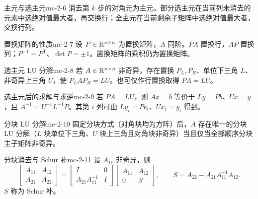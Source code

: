 \begin{definition}{主元与选主元}{mc-2-6}
消去第 $k$ 步的对角元为主元。部分选主元在当前列未消去的元素中选绝对值最大者，再交换行；全主元在当前剩余子矩阵中选绝对值最大者，交换行列。
\end{definition}

\begin{lemma}{置换矩阵的性质}{mc-2-7}
设 $P\in\mathbb{R}^{n\times n}$ 为置换矩阵，$A$ 同阶。$PA$ 置换行，$AP$ 置换列；$P^{-1}=P^{\mathsf T}$、$\det P=\pm1$。置换矩阵的乘积仍为置换矩阵。
\end{lemma}

\begin{theorem}{选主元 LU 分解}{mc-2-8}
若 $A\in\mathbb{R}^{n\times n}$ 非奇异，存在置换 $P_L,P_R$、单位下三角 $L$、非奇异上三角 $U$，使 $P_LAP_R=LU$。也可仅作行置换取得 $PA=LU$。
\end{theorem}

\begin{proposition}{选主元后的求解与求逆}{mc-2-9}
若 $PA=LU$，则 $Ax=b$ 等价于 $Ly=Pb$、$Ux=y$，且 $A^{-1}=U^{-1}L^{-1}P$。其第 $i$ 列可由 $Ly_i=Pe_i$、$Ux_i=y_i$ 得到。
\end{proposition}

\begin{theorem}{分块 LU 分解}{mc-2-10}
固定分块方式（对角块均为方阵）后，$A$ 存在唯一的分块 LU 分解（$L$ 块单位下三角、$U$ 块上三角且对角块非奇异）当且仅当全部顺序分块主子矩阵非奇异。
\end{theorem}

\begin{proposition}{分块消去与 Schur 补}{mc-2-11}
设 $A_{11}$ 非奇异，则
\[
\begin{bmatrix}A_{11}&A_{12}\\A_{21}&A_{22}\end{bmatrix}
=\begin{bmatrix}I&0\\A_{21}A_{11}^{-1}&I\end{bmatrix}
\begin{bmatrix}A_{11}&A_{12}\\0&S\end{bmatrix},\qquad S=A_{22}-A_{21}A_{11}^{-1}A_{12}.
\]
$S$ 称为 Schur 补。
\end{proposition}

